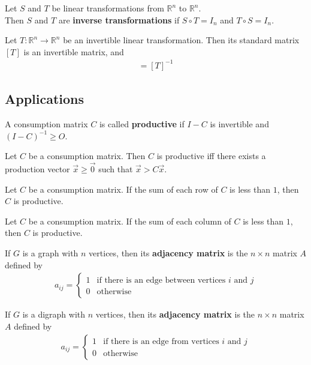 \documentclass{article}
\begin{document}
\begin{definition}
    Let $S$ and $T$ be linear transformations from $\mathbb{R}^n$ to $\mathbb{R}^n$.\\
    Then $S$ and $T$ are \textbf{inverse transformations} if $S\circ T= I_n$ and $T\circ S=I_n$.
\end{definition}
\begin{theorem}
    Let $T:\mathbb{R}^n\to\mathbb{R}^n$ be an invertible linear transformation. Then its standard matrix $[T]$ is an invertible matrix, and
    \begin{gather*}
        [T^{-1}] = [T]^{-1}
    \end{gather*}
\end{theorem}
\subsection{Applications}
\begin{definition}
    A consumption matrix $C$ is called \textbf{productive} if $I-C$ is invertible and $(I-C)^{-1}\geq O$.
\end{definition}
\begin{theorem}
    Let $C$ be a consumption matrix. Then $C$ is productive iff there exists a production vector $\vec x \geq \vec 0$ such that $\vec x > C\vec x$.
\end{theorem}
\begin{theorem}
    Let $C$ be a consumption matrix. If the sum of each row of $C$ is less than $1$, then $C$ is productive.
\end{theorem}
\begin{theorem}
    Let $C$ be a consumption matrix. If the sum of each column of $C$ is less than $1$, then $C$ is productive.
\end{theorem}
\begin{definition}
    If $G$ is a graph with $n$ vertices, then its \textbf{adjacency matrix} is the $n\times n$ matrix $A$ defined by
    \begin{gather*}
        a_{ij} = \begin{cases}
            1 & \text{if there is an edge between vertices $i$ and $j$} \\
            0 & \text{otherwise}
        \end{cases}
    \end{gather*}
\end{definition}
\begin{definition}
    If $G$ is a digraph with $n$ vertices, then its \textbf{adjacency matrix} is the $n\times n$ matrix $A$ defined by
    \begin{gather*}
        a_{ij} = \begin{cases}
            1 & \text{if there is an edge from vertices $i$ and $j$} \\
            0 & \text{otherwise}
        \end{cases}
    \end{gather*}
\end{definition}
\end{document}

